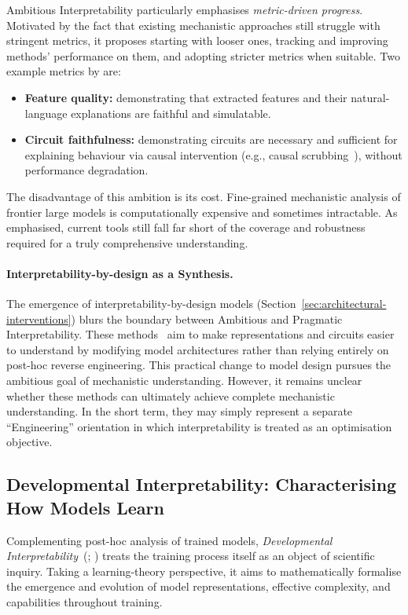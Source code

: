 Ambitious Interpretability particularly emphasises \emph{metric-driven progress}. Motivated by the fact that existing mechanistic approaches still struggle with stringent metrics, it proposes starting with looser ones, tracking and improving methods’ performance on them, and adopting stricter metrics when suitable. Two example metrics by  are:
\begin{itemize}
    \item \textbf{Feature quality:} demonstrating that extracted features and their natural-language explanations are faithful and simulatable.
    \item \textbf{Circuit faithfulness:} demonstrating circuits are necessary and sufficient for explaining behaviour via causal intervention (e.g., causal scrubbing~), without performance degradation.
\end{itemize}

The disadvantage of this ambition is its cost. Fine-grained mechanistic analysis of frontier large models is computationally expensive and sometimes intractable. As  emphasised, current tools still fall far short of the coverage and robustness required for a truly comprehensive understanding.

\paragraph{Interpretability-by-design as a Synthesis.}
The emergence of interpretability-by-design models (Section~\ref{sec:architectural-interventions}) blurs the boundary between Ambitious and Pragmatic Interpretability. These methods~ aim to make representations and circuits easier to understand by modifying model architectures rather than relying entirely on post-hoc reverse engineering. This practical change to model design pursues the ambitious goal of mechanistic understanding. However, it remains unclear whether these methods can ultimately achieve complete mechanistic understanding. In the short term, they may simply represent a separate ``Engineering'' orientation in which interpretability is treated as an optimisation objective.

\subsection{Developmental Interpretability: Characterising How Models Learn}
\label{subsec:dev interp}
Complementing post-hoc analysis of trained models, \emph{Developmental Interpretability}~(; )
treats the training process itself as an object of scientific inquiry. Taking a learning-theory perspective, it aims to mathematically formalise the emergence and evolution of model representations, effective complexity, and capabilities throughout training.

